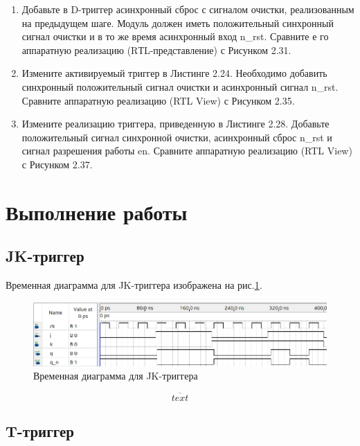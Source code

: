 \documentclass[a4paper,14pt]{article}
\begin{document}
\begin{enumerate}
	\item Добавьте в D-триггер асинхронный сброс с сигналом очистки, реализованным на предыдущем шаге.
	Модуль должен иметь положительный синхронный сигнал очистки и в то же время асинхронный вход n\_rst.
	Сравните е го аппаратную реализацию (RТL-представление) с Рисунком 2.31.
	
	\item Измените активируемый триггер в Листинге 2.24.
	Необходимо добавить синхронный положительный сигнал очистки и асинхронный сигнал n\_rst.
	Сравните аппаратную реализацию (RTL View) с Рисунком 2.35.
	
	\item Измените реализацию триггера, приведенную в Листинге 2.28. 
	Добавьте положительный сигнал синхронной очистки, асинхронный сброс n\_rst и сигнал разрешения работы en.
	Сравните аппаратную реализацию (RTL View) с Рисунком 2.37.
\end{enumerate}

\section{Выполнение работы}

\subsection{JK-триггер}


Временная диаграмма для JK-триггера изображена на рис.\ref{fig:jk_wave}.

\begin{figure}[H]
	\centering
	\includegraphics[width=0.95\linewidth]{imgs/jk_wave}
	\caption{Временная диаграмма для JK-триггера}
	\label{fig:jk_wave}
\end{figure}

$$ \overline{text}$$

\subsection{T-триггер}

\end{document}

